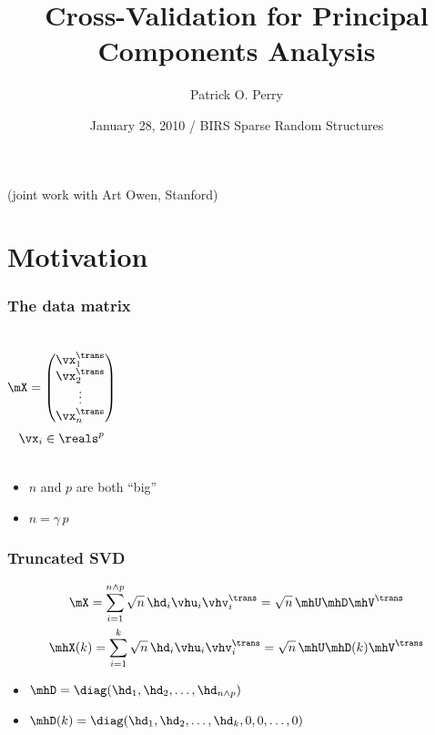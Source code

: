 \documentclass[14pt]{beamer}
\title{Cross-Validation for Principal Components Analysis}
\author[P. O. Perry]{Patrick O. Perry}
\institute[Harvard University]
{
  Statistics and Information Sciences Laboratory\\
  Harvard University
}
\date[BIRS Workshop on Sparse Random Structures]
{January 28, 2010 / BIRS Sparse Random Structures}
\begin{document}
\begin{frame}
  \titlepage
  \hfill\small{(joint work with Art Owen, Stanford)}
\end{frame}


\section{Motivation}

\begin{frame}
  \frametitle{The data matrix}
  \begin{columns}[c]
    \[
      \mX
	=
	\left(
	\begin{matrix}
	  \vx_1^\trans \\
	  \vx_2^\trans \\
	  \vdots \\
	  \vx_n^\trans
	\end{matrix}
	\right)
    \]
    \[
      \vx_{i} \in \reals^p
    \]
  \end{columns}
  \begin{center}
    \begin{itemize}
      \item $n$ and $p$ are both ``big'' \\
      \item $n = \gamma \, p$
    \end{itemize}
  \end{center}
\end{frame}

\begin{frame}
  \frametitle{Truncated SVD}
  \begin{gather*}
    \mX = \sum_{i=1}^{n \wedge p} \sqrt{n} \, \hd_i \vhu_i \vhv_i^\trans = \sqrt{n} \, \mhU \mhD \mhV^\trans \\
    \mhX(k) = \sum_{i=1}^k \sqrt{n} \, \hd_i \vhu_i \vhv_i^\trans = \sqrt{n} \, \mhU \mhD(k) \mhV^\trans
  \end{gather*}

  \begin{itemize}
  \item $\mhD = \diag(\hd_1, \hd_2, \ldots, \hd_{n \wedge p})$
  \item $\mhD(k) = \diag(\hd_1, \hd_2, \ldots, \hd_k, 0, 0, \ldots, 0)$ 
  \end{itemize}
\end{frame}
\end{document}
